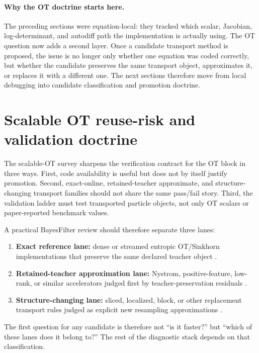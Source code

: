 \paragraph{Why the OT doctrine starts here.}
The preceding sections were equation-local: they tracked which scalar, Jacobian,
log-determinant, and autodiff path the implementation is actually using.  The OT
question now adds a second layer.  Once a candidate transport method is proposed,
the issue is no longer only whether one equation was coded correctly, but whether
the candidate preserves the same transport object, approximates it, or replaces it
with a different one.  The next sections therefore move from local debugging into
candidate classification and promotion doctrine.

\section{Scalable OT reuse-risk and validation doctrine}
\label{sec:bf-dpf-debug-scalable-ot-stack}

The scalable-OT survey sharpens the verification contract for the OT block in
three ways.  First, code availability is useful but does not by itself justify
promotion.  Second, exact-online, retained-teacher approximate, and
structure-changing transport families should not share the same pass/fail story.
Third, the validation ladder must test transported particle objects, not only OT
scalars or paper-reported benchmark values.

A practical BayesFilter review should therefore separate three lanes:
\begin{enumerate}[label=(\roman*)]
  \item \textbf{Exact reference lane:} dense or streamed entropic OT/Sinkhorn
    implementations that preserve the same declared teacher object
    \citep{feydy2019geomloss,charlier2021keops,ye2026flashsinkhorn,xiao2026fastsinkhorn}.
  \item \textbf{Retained-teacher approximation lane:} Nystrom, positive-feature,
    low-rank, or similar accelerators judged first by teacher-preservation
    residuals \citep{altschuler2019nystrom,scetbon2020positivefeatures,forrow2019factored,scetbon2021lowrank}.
  \item \textbf{Structure-changing lane:} sliced, localized, block, or other
    replacement transport rules judged as explicit new resampling
    approximations \citep{kolouri2019generalized,deshpande2019maxsliced,paty2019subspace,nguyen2025sliced}.
\end{enumerate}
The first question for any candidate is therefore not ``is it faster?'' but
``which of these lanes does it belong to?''  The rest of the diagnostic stack
depends on that classification.

